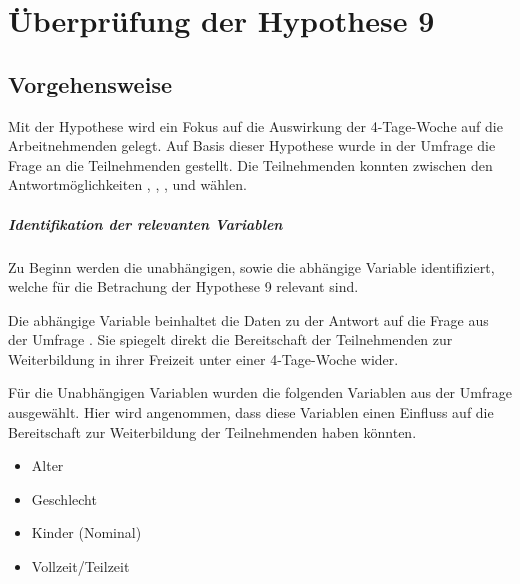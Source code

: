
\chapter{Überprüfung der Hypothese 9}
\label{chap:hypothese9}

\section{Vorgehensweise}
Mit der Hypothese  wird ein Fokus auf die 
Auswirkung der 4-Tage-Woche auf die Arbeitnehmenden gelegt. Auf Basis dieser Hypothese 
wurde in der Umfrage
die Frage  an die Teilnehmenden gestellt.
Die Teilnehmenden konnten zwischen den Antwortmöglichkeiten , , , 
 und  wählen.

\paragraph*{Identifikation der relevanten Variablen}

Zu Beginn werden die unabhängigen, sowie die abhängige Variable identifiziert, welche für die 
Betrachung der Hypothese 9 relevant sind.

Die abhängige Variable beinhaltet die Daten zu der Antwort auf die Frage aus der Umfrage
.
Sie spiegelt direkt die Bereitschaft der Teilnehmenden zur Weiterbildung in ihrer Freizeit 
unter einer 4-Tage-Woche wider.

Für die Unabhängigen Variablen wurden die folgenden Variablen aus der Umfrage ausgewählt. 
Hier wird angenommen, dass diese Variablen einen Einfluss auf die Bereitschaft zur 
Weiterbildung der Teilnehmenden haben könnten.
\begin{itemize}
    \item Alter
    \item Geschlecht %
    \item Kinder (Nominal)
    \item Vollzeit/Teilzeit
\end{itemize}


